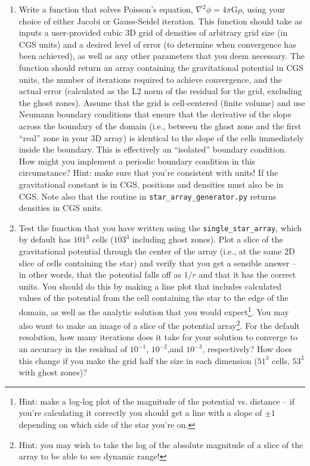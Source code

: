\documentclass[10pt]{article}
\begin{document}
\begin{enumerate}

\item  Write a function that solves Poisson's equation, $\nabla^2 \phi
= 4 \pi \mathrm{G} \rho$, using your choice of either Jacobi or Gauss-Seidel
iteration.  This function should take as inputs a user-provided cubic
3D grid of densities of arbitrary grid size (in CGS units) and a
desired level of error (to determine when convergence has been achieved), as well as any
other parameters that you deem necessary.  The function should return
an array containing the gravitational potential in CGS units, the
number of iterations required to achieve convergence, and the actual
error (calculated as the L2 norm of the residual for the grid,
excluding the ghost zones).  Assume that the grid is
cell-centered (finite volume) and use Neumann boundary conditions
that ensure that the derivative of the slope across the boundary of
the domain (i.e., between the ghost zone and the first ``real'' zone
in your 3D array) is identical to the slope of the cells immediately
inside the boundary.  This is effectively an ``isolated'' boundary
condition.  How might you implement a periodic boundary condition in
this circumstance?  Hint: make sure that you're consistent with units!  If the gravitational
constant is in CGS, positions and densities must also be in CGS. Note
also that the
routine in \texttt{star\_array\_generator.py} returns densities in CGS units.

\item Test the function that you have written using the
\texttt{single\_star\_array}, which by default has $101^3$ cells
($103^3$ including ghost zones).  Plot a slice of the gravitational
potential through the center of the array (i.e., at the same 2D slice
of cells containing the star) and verify that you get a sensible
answer -- in other words, that the potential falls off as $1/r$ and
that it has the correct units.  You should do this by making a line
plot that includes calculated values of the potential from the cell
containing the star to the edge of the domain, as well as the analytic
solution that you would expect\footnote{Hint: make a log-log plot of the
magnitude of the potential vs. distance -- if you're calculating it
correctly you should get a line with a slope of $\pm 1$ depending on
which side of the star you're on.}.  You may also want to make an image of
a slice of the potential array\footnote{Hint: you may wish to take the log of
the absolute magnitude of a slice of the array to be able to see
dynamic range!}.
For the default resolution, how many iterations does it take for your solution to
converge to an accuracy in the residual of $10^{-1}$, $10^{-2}$,and $10^{-3}$,
respectively?  How does this change if you make the grid half the size
in each dimension ($51^3$ cells, $53^3$ with ghost zones)?


\end{enumerate}
\end{document}

